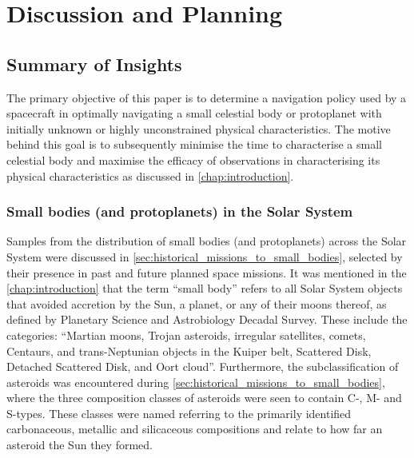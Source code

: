 \chapter{Discussion and Planning}

\section{Summary of Insights}
The primary objective of this paper is to determine a navigation policy used by a spacecraft in optimally navigating a small celestial body or protoplanet with initially unknown or highly unconstrained physical characteristics. The motive behind this goal is to subsequently minimise the time to characterise a small celestial body and maximise the efficacy of observations in characterising its physical characteristics as discussed in \autoref{chap:introduction}.

\subsection{Small bodies (and protoplanets) in the Solar System}\label{ssec:insight:small-bodies}

Samples from the distribution of small bodies (and protoplanets) across the Solar System were discussed in \autoref{sec:historical_missions_to_small_bodies}, selected by their presence in past and future planned space missions. It was mentioned in the \autoref{chap:introduction} that the term ``small body'' refers to all Solar System objects that avoided accretion by the Sun, a planet, or any of their moons thereof, as defined by Planetary Science and Astrobiology Decadal Survey. These include the categories: ``Martian moons, Trojan asteroids, irregular satellites, comets, Centaurs, and trans-Neptunian objects in the Kuiper belt, Scattered Disk, Detached Scattered Disk, and Oort cloud''. Furthermore, the subclassification of asteroids was encountered during \autoref{sec:historical_missions_to_small_bodies}, where the three composition classes of asteroids were seen to contain C-, M- and S-types. These classes were named referring to the primarily identified carbonaceous, metallic and silicaceous compositions and relate to how far an asteroid the Sun they formed.

